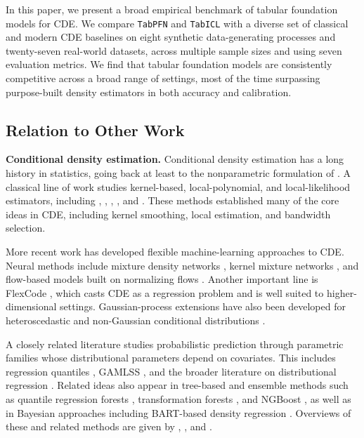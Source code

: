 \documentclass{article}
\newcommand{\method}[1]{\texttt{#1}}
\begin{document}
In this paper, we present a broad empirical benchmark of tabular foundation
models for CDE. We compare \method{TabPFN} and \method{TabICL} with a diverse
set of classical and modern CDE baselines on eight synthetic data-generating
processes and twenty-seven real-world datasets, across multiple sample sizes and
using seven evaluation metrics. We find that tabular foundation models are
consistently competitive across a broad range of settings, most of the time surpassing purpose-built density estimators in both accuracy and
calibration.



\subsection{Relation to Other Work}
\label{sec:related}

\textbf{Conditional density estimation.}
Conditional density estimation has a long history in statistics, going back at least to the nonparametric formulation of \citet{rosenblatt1969conditional}. A classical line of work studies kernel-based, local-polynomial, and local-likelihood estimators, including \citet{hyndman1996estimating}, \citet{fan1996estimation}, \citet{bashtannyk2001bandwidth}, \citet{hyndman2002nonparametric}, and \citet{efromovich2007conditional}. These methods established many of the core ideas in CDE, including kernel smoothing, local estimation, and bandwidth selection.

More recent work has developed flexible machine-learning approaches to CDE. Neural methods include mixture density networks \citep{bishop1994mixture}, kernel mixture networks \citep{ambrogioni2017kmn}, and flow-based models built on normalizing flows \citep{dinh2014nice,dinh2017realnvp,papamakarios2017maf,huang2018naf,durkan2019nsf,papamakarios2021normalizing}. Another important line is FlexCode \citep{izbicki2017converting}, which casts CDE as a regression problem and is well suited to higher-dimensional settings. Gaussian-process extensions have also been developed for heteroscedastic and non-Gaussian conditional distributions \citep{le2005heteroscedastic,platanios2013mgpch,dutordoir2018gpcde}.

A closely related literature studies probabilistic prediction through parametric families whose distributional parameters depend on covariates. This includes regression quantiles \citep{koenker1978regression}, GAMLSS \citep{rigby2005generalized}, and the broader literature on distributional regression \citep{kneib2023rage,klein2024distributional}. Related ideas also appear in tree-based and ensemble methods such as quantile regression forests \citep{meinshausen2006quantile}, transformation forests \citep{hothorn2021transformation}, and NGBoost \citep{duan2020ngboost}, as well as in Bayesian approaches including BART-based density regression \citep{chipman2010bart,orlandi2021drbart,li2023adaptive}. Overviews of these and related methods are given by \citet{dalmasso2020cdetools}, \citet{kneib2023rage}, and \citet{klein2024distributional}.
\end{document}

